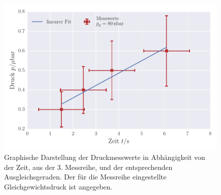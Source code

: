 \begin{figure}[!h]
 \centering
 \includegraphics[scale=0.8]{../Grafiken/Leckrate_Turbo_2.pdf}
 \caption{Graphische Darstellung der Druckmesswerte in Abhängigkeit von der Zeit, aus der 3. Messreihe, und der
 	entsprechenden Ausgleichsgeraden. Der für die Messreihe eingestellte Gleichgewichtsdruck ist angegeben. \label{fig:leckrate_turbo_2}}
 \end{figure} 